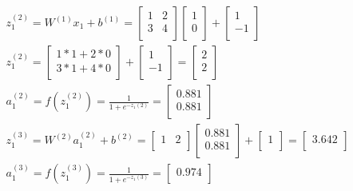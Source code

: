 \documentclass[leqno]{article}
\begin{document}
\begin{gather*}
\begin{split}
&z_1^{(2)} = W^{(1)}x_1 + b^{(1)} =
  \begin{bmatrix}
  1 & 2\\
  3 & 4\\ 
  \end{bmatrix}
  \begin{bmatrix}
  1\\
  0\\ 
  \end{bmatrix}
  +
 \begin{bmatrix}
  1\\
  -1\\ 
  \end{bmatrix}
\\
&z_1^{(2)} = 
  \begin{bmatrix}
  1*1 + 2*0\\
  3*1 + 4*0\\ 
  \end{bmatrix}
  +
 \begin{bmatrix}
  1\\
  -1\\ 
  \end{bmatrix}
=
 \begin{bmatrix}
  2\\
  2\\ 
  \end{bmatrix}
\\
&a_1^{(2)} = f(z_1^{(2)}) = \frac{1}{1 + e^{-z_1{(2)}}} =
 \begin{bmatrix}
   0.881\\
   0.881\\ 
  \end{bmatrix}
\\
&z_1^{(3)} = W^{(2)}a_1^{(2)} + b^{(2)} =
 \begin{bmatrix}
   1 & 2\\
  \end{bmatrix}
 \begin{bmatrix}
   0.881\\
   0.881\\ 
  \end{bmatrix} 
  +
   \begin{bmatrix}
   1\\
  \end{bmatrix}
  =
 \begin{bmatrix}
   3.642\\ 
  \end{bmatrix}
\\
&a_1^{(3)} = f(z_1^{(3)}) = \frac{1}{1 + e^{-z_1{(3)}}} =
 \begin{bmatrix}
   0.974\\ 
  \end{bmatrix}
\end{split}
\end{gather*}
\end{document}
